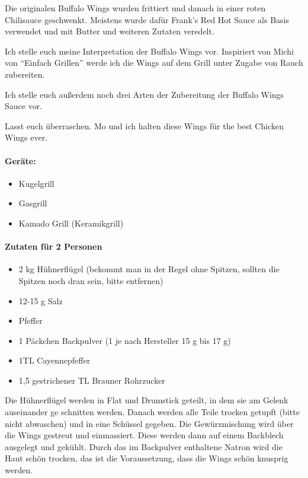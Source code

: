 Die originalen Buffalo Wings wurden frittiert und danach in einer roten Chilisauce 
geschwenkt. 
Meistens wurde dafür Frank's Red Hot 
Sauce als Basis verwendet und mit Butter und weiteren Zutaten veredelt.

Ich stelle euch meine Interpretation der Buffalo Wings vor. 
Inspiriert von Michi von "`Einfach Grillen"' werde ich die Wings auf dem Grill 
unter Zugabe 
von Rauch zubereiten. 

Ich stelle euch außerdem noch drei Arten der Zubereitung der Buffalo Wings 
Sauce vor.

Lasst euch überraschen. Mo und ich halten diese Wings für the best Chicken 
Wings ever.


\paragraph{Geräte:}

\begin{itemize}[noitemsep]
	\item Kugelgrill
	\item Gasgrill
	\item Kamado Grill (Keramikgrill)
\end{itemize}

\paragraph{Zutaten für 2 Personen}

\begin{itemize}[noitemsep]
	\item 2 kg Hühnerflügel (bekommt man in der Regel ohne Spitzen, sollten die 
	Spitzen noch 
	dran sein, bitte entfernen)
	\item 12-15 g Salz
	\item Pfeffer
	\item 1 Päckchen Backpulver (1 je nach Hersteller 15 g bis 17 g)
	\item 1TL Cayennepfeffer
	\item 1,5 gestrichener TL Brauner Rohrzucker
\end{itemize}

Die Hühnerflügel werden in Flat und Drumstick geteilt, in dem sie am Gelenk 
auseinander ge
schnitten werden. Danach werden alle Teile 
trocken getupft (bitte nicht abwaschen) und in eine Schüssel gegeben. Die 
Gewürzmischung 
wird über die Wings gestreut und 
einmassiert. Diese werden dann auf einem Backblech ausgelegt und gekühlt. 
Durch das im Backpulver enthaltene Natron wird die Haut schön trocken, das ist 
die 
Voraussetzung, dass die Wings schön 
knusprig werden.

